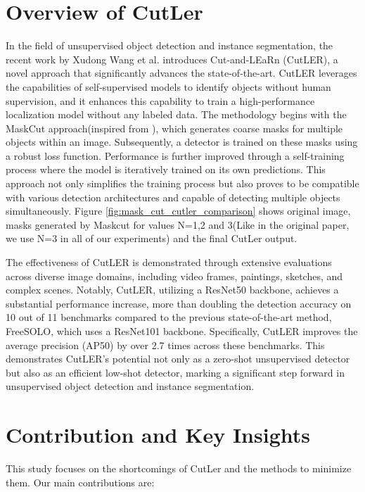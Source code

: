 \section{Overview of CutLer}
In the field of unsupervised object detection and instance segmentation, the recent work by Xudong Wang et al. introduces Cut-and-LEaRn (CutLER)\cite{wang2023cut}, a novel approach that significantly advances the state-of-the-art. CutLER leverages the capabilities of self-supervised models to identify objects without human supervision, and it enhances this capability to train a high-performance localization model without any labeled data. The methodology begins with the MaskCut approach(inspired from \cite{wang2022tokencut}), which generates coarse masks for multiple objects within an image. Subsequently, a detector is trained on these masks using a robust loss function. Performance is further improved through a self-training process where the model is iteratively trained on its own predictions. This approach not only simplifies the training process but also proves to be compatible with various detection architectures and capable of detecting multiple objects simultaneously. Figure \ref{fig:mask_cut_cutler_comparison} shows original image, masks generated by Maskcut for values N=1,2 and 3(Like in the original paper, we use N=3 in all of our experiments) and the final CutLer output.

The effectiveness of CutLER is demonstrated through extensive evaluations across diverse image domains, including video frames, paintings, sketches, and complex scenes. Notably, CutLER, utilizing a ResNet50 backbone, achieves a substantial performance increase, more than doubling the detection accuracy on 10 out of 11 benchmarks compared to the previous state-of-the-art method, FreeSOLO, which uses a ResNet101 backbone. Specifically, CutLER improves the average precision (AP50) by over 2.7 times across these benchmarks. This demonstrates CutLER's potential not only as a zero-shot unsupervised detector but also as an efficient low-shot detector, marking a significant step forward in unsupervised object detection and instance segmentation.

\section{Contribution and Key Insights}

This study focuses on the shortcomings of CutLer and the methods to minimize them. Our main contributions are:

